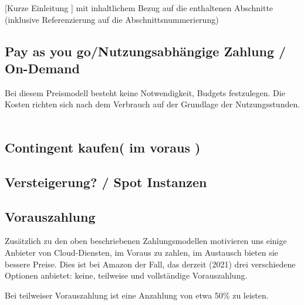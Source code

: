 [Kurze Einleitung ] mit inhaltlichem Bezug auf die enthaltenen Abschnitte (inklusive Referenzierung auf die Abschnittsnummerierung)


\subsection{Pay as you go/Nutzungsabhängige Zahlung / On-Demand}
Bei diesem Preismodell besteht keine Notwendigkeit, Budgets festzulegen. Die Kosten richten sich nach dem Verbrauch auf der Grundlage der Nutzungsstunden.
\\\\
\subsection{Contingent kaufen( im voraus )}


\subsection{Versteigerung? / Spot Instanzen }


\subsection{Vorauszahlung}
Zusätzlich zu den oben beschriebenen Zahlungsmodellen motivieren uns einige Anbieter von Cloud-Diensten, im Voraus zu zahlen, im Austausch bieten sie bessere Preise. Dies ist bei Amazon der Fall, das derzeit (2021) drei verschiedene Optionen anbietet: keine, teilweise und vollständige Vorauszahlung.

Bei teilweiser Vorauszahlung ist eine Anzahlung von etwa 50\% zu leisten.
